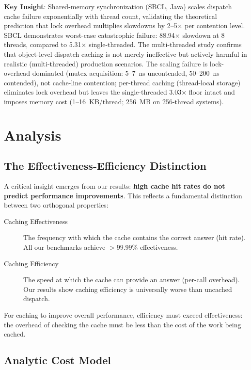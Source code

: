 \documentclass[sigplan,final,acmsmall,review,screen]{acmart}
\begin{document}
\textbf{Key Insight}: Shared-memory synchronization (SBCL, Java) scales dispatch cache failure exponentially with thread count, validating the theoretical prediction that lock overhead multiplies slowdowns by 2--5× per contention level.
SBCL demonstrates worst-case catastrophic failure: 88.94× slowdown at 8 threads, compared to 5.31× single-threaded.
The multi-threaded study confirms that object-level dispatch caching is not merely ineffective but actively harmful in realistic (multi-threaded) production scenarios. The scaling failure is lock-overhead dominated (mutex acquisition: 5--7~ns uncontended, 50--200~ns contended), not cache-line contention; per-thread caching (thread-local storage) eliminates lock overhead but leaves the single-threaded 3.03$\times$ floor intact and imposes memory cost (1--16~KB/thread; 256~MB on 256-thread systems).

\section{Analysis}

\subsection{The Effectiveness-Efficiency Distinction}

A critical insight emerges from our results: \textbf{high cache hit rates do not predict
performance improvements}. This reflects a fundamental distinction between two orthogonal
properties:

\begin{description}
  \item[Caching Effectiveness] The frequency with which the cache contains the correct answer
    (hit rate). All our benchmarks achieve $>99.99\%$ effectiveness.

  \item[Caching Efficiency] The speed at which the cache can provide an answer (per-call overhead).
    Our results show caching efficiency is universally worse than uncached dispatch.
\end{description}

For caching to improve overall performance, efficiency must exceed effectiveness: the overhead
of checking the cache must be less than the cost of the work being cached.

\subsection{Analytic Cost Model}
\end{document}
